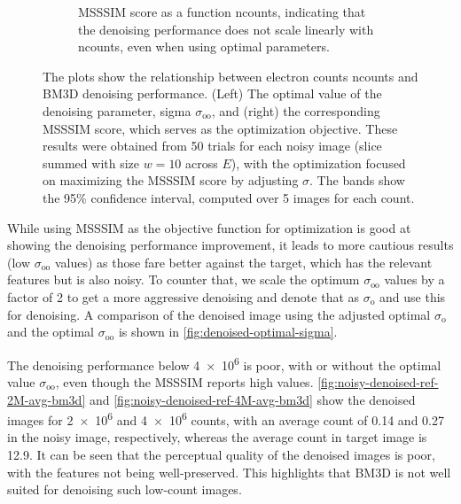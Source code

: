 \begin{figure}
\begin{subfigure}[t]{0.49\linewidth}
        \caption{\gls{MSSSIM} score as a function \gls{ncounts}, indicating that the denoising performance does not scale linearly with \gls{ncounts}, even when using optimal parameters.}
        \label{fig:hyperparameter-msssim-averaged-10-images}
    \end{subfigure}
    \caption{The plots show the relationship between electron counts \gls{ncounts} and \gls{BM3D} denoising performance. (Left) The optimal value of the denoising parameter, sigma $\sigma_{\text{oo}}$, and (right) the corresponding \gls{MSSSIM} score, which serves as the optimization objective. These results were obtained from \num{50} trials for each noisy image (slice summed with size $w=10$ across $E$), with the optimization focused on maximizing the \gls{MSSSIM} score by adjusting $\sigma$. The bands show the \num{95}\% confidence interval, computed over \num{5} images for each count.}
    \label{fig:hyperparameter-averaged-10-images}
\end{figure}

While using \gls{MSSSIM} as the objective function for optimization is good at showing the denoising performance improvement, it leads to more cautious results (low $\sigma_{\text{oo}}$ values) as those fare better against the target, which has the relevant features but is also noisy. To counter that, we scale the optimum $\sigma_{\text{oo}}$ values by a factor of 2 to get a more aggressive denoising and denote that as $\sigma_{\text{o}}$ and use this for denoising. A comparison of the denoised image using the adjusted optimal $\sigma_{\text{o}}$ and the optimal $\sigma_{\text{oo}}$ is shown in \cref{fig:denoised-optimal-sigma}.

The denoising performance below \num{4e6}  is poor, with or without the optimal value $\sigma_{\text{oo}}$, even though the \gls{MSSSIM} reports high values. \cref{fig:noisy-denoised-ref-2M-avg-bm3d} and \cref{fig:noisy-denoised-ref-4M-avg-bm3d} show the denoised images for \num{2e6} and \num{4e6} counts, with an average count of \num{0.14} and \num{0.27}  in the noisy image, respectively, whereas the average count in target image is \num{12.9}. It can be seen that the perceptual  quality of the denoised images is poor, with the features not being well-preserved. This highlights that \gls{BM3D} is not well suited for denoising such low-count images.



